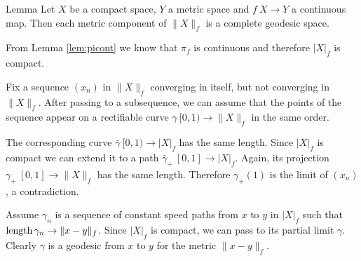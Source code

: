 \documentclass{article}
\begin{document}
\begin{thm}{Lemma}\label{lem:geospace}
Let $X$ be a compact %
space, $Y$ a metric space and $f\:X\to Y$ a continuous map. 
Then each metric component of $\|X\|_f$ is a complete geodesic space.
\end{thm}

From Lemma \ref{lem:picont} we know that $\pi_f$ is continuous and therefore $|X|_f$ is compact.

Fix a sequence $(x_n)$ in $\|X\|_f$ converging in itself, but not converging in $\|X\|_f$.
After passing to a subsequence, we can assume that the points of the sequence appear on a rectifiable curve $\gamma\:[0,1)\to\|X\|_f$ in the same order.

The corresponding curve $\bar\gamma\:[0,1)\to |X|_f$ has the same length.
Since $|X|_f$ is compact we can extend it to a path $\bar\gamma_+\:[0,1]\to |X|_f$.
Again, its projection $\gamma_+\:[0,1]\to\|X\|_f$ has the same length.
Therefore $\gamma_+(1)$ is the limit of $(x_n)$, a contradiction.

Assume $\gamma_n$ is a sequence of constant speed paths from $x$ to $y$ in $|X|_f$
such that $\mathop{\rm length}\nolimits\gamma_n\to \|x-y\|_f$.
Since $|X|_f$ is compact, we can pass to its partial limit $\gamma$.
Clearly $\gamma$ is a geodesic from $x$ to $y$ for the metric $\|x-y\|_f$.
\qeds


\end{document}
